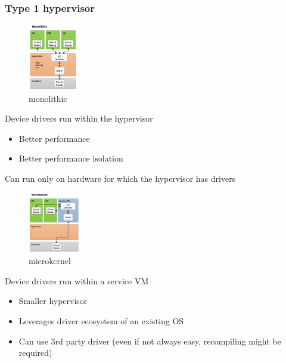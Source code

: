 \documentclass[10pt, oneside]{article}
\begin{document}
\subsubsection{Type 1 hypervisor}
\begin{multicols}{4}
    \begin{figure}[H]
        \begin{center}
        \includegraphics[width=0.2\textwidth]{img/img40.png}
        \caption{monolithic}
        \label{fig:monolithic}
        \end{center}
    \end{figure}
    \columnbreak
    \noindent
    Device drivers run within the hypervisor \begin{itemize}
        \item Better performance
        \item Better performance isolation
    \end{itemize}Can run only on hardware for which the hypervisor has drivers
    \columnbreak
    \begin{figure}[H]
        \begin{center}
        \includegraphics[width=0.2\textwidth]{img/img41.png}
        \caption{microkernel}
        \label{fig:Microkernel}
        \end{center}
    \end{figure}
    \columnbreak
    \noindent
    Device drivers run within a service VM \begin{itemize}
        \item Smaller hypervisor
        \item Leverages driver ecosystem of an existing OS
        \item Can use 3rd party driver (even if not always easy, recompiling might be required)
    \end{itemize}
\end{multicols}
\end{document}
